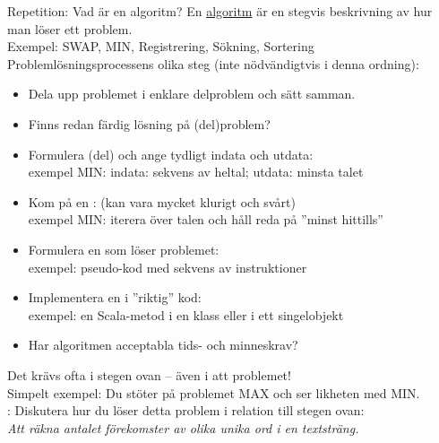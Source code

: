 


\begin{Slide}{Repetition: Vad är en algoritm? }\SlideFontTiny
\pause En \href{https://sv.wikipedia.org/wiki/Algoritm}{algoritm} är en stegvis beskrivning av hur man löser ett problem. \\ 
Exempel: SWAP, MIN, Registrering, Sökning, Sortering \\
\pause\vspace{0.5em}
Problemlösningsprocessens olika steg (inte nödvändigtvis i denna ordning): 
\begin{itemize}
\item Dela upp problemet i enklare delproblem och sätt samman.
\item Finns redan färdig lösning på (del)problem?
\item Formulera (del) och ange tydligt indata och utdata: \\ exempel MIN: indata: sekvens av heltal; utdata: minsta talet
\item Kom på en : (kan  vara mycket klurigt och svårt) \\ exempel MIN: iterera över talen och håll reda på ''minst hittills''
\item Formulera en  som löser problemet: \\ exempel: pseudo-kod med sekvens av instruktioner
\item Implementera en  i ''riktig'' kod: \\ exempel: en Scala-metod i en klass eller i ett singelobjekt
\item Har algoritmen acceptabla tids- och minneskrav?
\end{itemize}
\pause\vspace{0.5em} Det krävs ofta  i stegen ovan  -- även i att  problemet!\\
Simpelt exempel: Du stöter på problemet MAX och ser likheten med MIN.\\
\pause\vspace{0.5em}: Diskutera hur du löser detta problem i relation till stegen ovan: \\
\emph{Att räkna antalet förekomster av olika unika ord i en textsträng.} 
\end{Slide}












